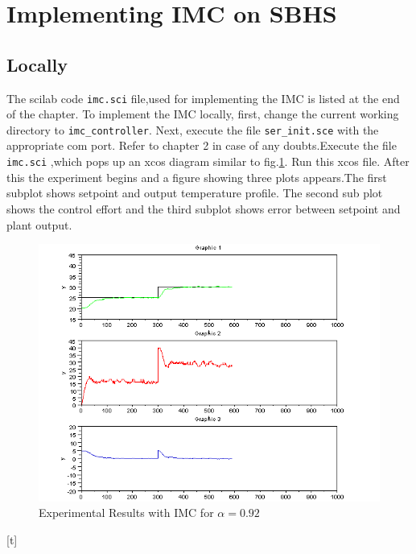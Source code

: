 \section{Implementing IMC on SBHS}
\subsection{Locally}
The scilab code {\tt imc.sci} file,used for implementing the IMC is listed at the end of the chapter. To implement the IMC locally, first, change the current working directory to {\tt imc\_controller}. Next, execute the file {\tt ser\_init.sce} with the appropriate com port. Refer to chapter 2 in case of any doubts.Execute the file {\tt imc.sci} ,which pops up an xcos diagram similar to fig.\ref{fig:0.991}. Run this xcos file. After this the experiment begins and  a figure showing three plots appears.The  first subplot shows setpoint and output temperature profile. The second sub plot shows the control effort and the third subplot shows error between setpoint and plant output. \\
\begin{figure}[h]
	\centering
		\includegraphics[width=\linewidth]{IMC/imc_092_resp.png}
	\caption{Experimental Results with IMC for $\alpha=0.92$}
	\label{fig:0.991}
\end{figure}[t]
